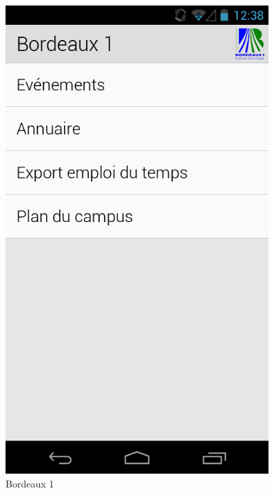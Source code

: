 \documentclass [pdftex,12pt] {report}
\begin{document}
\begin{figure}
\begin{minipage}[t]{8cm}
    \label{fig:01}
  \end{minipage}
  \begin{minipage}[t]{8cm}
    \centering
    \includegraphics[width=0.9\textwidth]{resources/ui_preview/02}
    \caption{Bordeaux 1}
    \label{fig:02}
  \end{minipage}
\end{figure}
\end{document}
